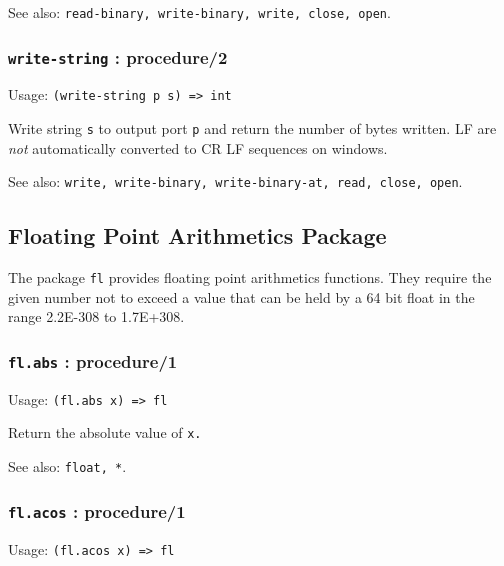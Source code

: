 \documentclass[
]{article}
\newcommand{\passthrough}[1]{#1}
\begin{document}
See also:
\passthrough{\lstinline!read-binary, write-binary, write, close, open!}.

\hypertarget{write-string-procedure2}{%
\subsubsection{\texorpdfstring{\texttt{write-string} :
procedure/2}{write-string : procedure/2}}\label{write-string-procedure2}}

Usage: \passthrough{\lstinline!(write-string p s) => int!}

Write string \passthrough{\lstinline!s!} to output port
\passthrough{\lstinline!p!} and return the number of bytes written. LF
are \emph{not} automatically converted to CR LF sequences on windows.

See also:
\passthrough{\lstinline!write, write-binary, write-binary-at, read, close, open!}.

\hypertarget{floating-point-arithmetics-package}{%
\subsection{Floating Point Arithmetics
Package}\label{floating-point-arithmetics-package}}

The package \passthrough{\lstinline!fl!} provides floating point
arithmetics functions. They require the given number not to exceed a
value that can be held by a 64 bit float in the range 2.2E-308 to
1.7E+308.

\hypertarget{fl.abs-procedure1}{%
\subsubsection{\texorpdfstring{\texttt{fl.abs} :
procedure/1}{fl.abs : procedure/1}}\label{fl.abs-procedure1}}

Usage: \passthrough{\lstinline!(fl.abs x) => fl!}

Return the absolute value of \passthrough{\lstinline!x.!}

See also: \passthrough{\lstinline!float, *!}.

\hypertarget{fl.acos-procedure1}{%
\subsubsection{\texorpdfstring{\texttt{fl.acos} :
procedure/1}{fl.acos : procedure/1}}\label{fl.acos-procedure1}}

Usage: \passthrough{\lstinline!(fl.acos x) => fl!}
\end{document}
